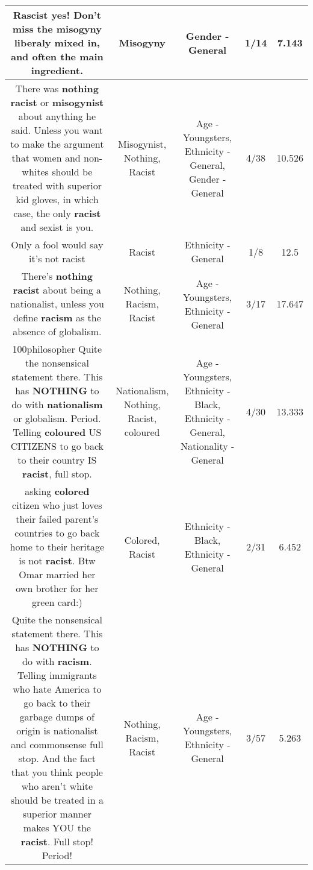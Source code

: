 \documentclass[11pt]{article}
\newlength\mylength
\begin{document}
\begin{center}
\begin{longtable}{|C{.65\mylength}|C{.30\mylength}|C{.12\mylength}|C{.12\mylength}|C{.12\mylength}|}
  \small Rascist yes! Don't miss the \textbf{misogyny} liberaly mixed in, and often the main ingredient.\normalsize   & Misogyny & Gender - General & 1/14 & 7.143 \\  \hline
  \small There was \textbf{nothing} \textbf{racist} or \textbf{misogynist} about anything he said. Unless you want to make the argument that women and non-whites should be treated with superior kid gloves, in which case, the only \textbf{racist} and sexist is you.\normalsize   & Misogynist, Nothing, Racist & Age - Youngsters, Ethnicity - General, Gender - General & 4/38 & 10.526 \\  \hline
  \small Only a fool would say it's not racist\normalsize   & Racist & Ethnicity - General & 1/8 & 12.5 \\  \hline
  \small {} There's \textbf{nothing} \textbf{racist} about being a nationalist, unless you define \textbf{racism} as the absence of globalism.\normalsize   & Nothing, Racism, Racist & Age - Youngsters, Ethnicity - General & 3/17 & 17.647 \\  \hline
  \small \@100philosopher Quite the nonsensical statement there.  This has \textbf{NOTHING} to do with \textbf{nationalism} or globalism.  Period.  Telling \textbf{coloured} US CITIZENS to go back to their country IS \textbf{racist}, full stop.\normalsize   & Nationalism, Nothing, Racist, coloured & Age - Youngsters, Ethnicity - Black, Ethnicity - General, Nationality - General & 4/30 & 13.333 \\  \hline
  \small {} asking \textbf{colored} citizen who just loves their failed parent's countries to go back home to their heritage is not \textbf{racist}. Btw Omar married her own brother for her green card:)\normalsize   & Colored, Racist & Ethnicity - Black, Ethnicity - General & 2/31 & 6.452 \\  \hline
  \small {} Quite the nonsensical statement there. This has \textbf{NOTHING} to do with \textbf{racism}. Telling immigrants who hate America to go back to their garbage dumps of origin is nationalist and commonsense full stop. And the fact that you think people who aren't white should be treated in a superior manner makes YOU the \textbf{racist}. Full stop! Period!\normalsize   & Nothing, Racism, Racist & Age - Youngsters, Ethnicity - General & 3/57 & 5.263 \\  \hline

\end{longtable}
\end{center}
\end{document}
